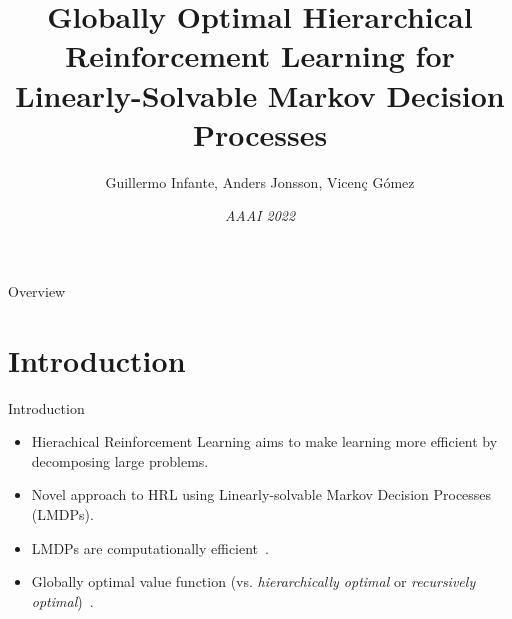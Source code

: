\documentclass{beamer}
\title[Globally Optimal HRL for LMDPs]{Globally Optimal Hierarchical Reinforcement Learning for Linearly-Solvable Markov Decision Processes}
\author[G. Infante, A. Jonsson, V. Gómez ]{Guillermo Infante, Anders Jonsson, Vicenç Gómez}
\date[]{\textit{AAAI 2022}}
\theoremstyle{mystyle}
\begin{document}
\begin{frame}
   \maketitle
\end{frame}

\begin{frame}{Overview}
\tableofcontents
\end{frame}

\section{Introduction}

\begin{frame}{Introduction}

\begin{itemize}
    \item Hierachical Reinforcement Learning aims to make {\color{blue} learning more efficient} by decomposing large problems. %
    \item Novel approach to HRL using Linearly-solvable Markov Decision Processes (LMDPs).
    \item LMDPs are {\color{blue} computationally efficient}~\citep{TodorovNIPS2007}.
    \item {\color{blue}Globally optimal value function} (vs. \textit{hierarchically optimal} or \textit{recursively optimal})~\citep{dietterich2000hierarchical}. 
\end{itemize}
    
\end{frame}
\end{document}
